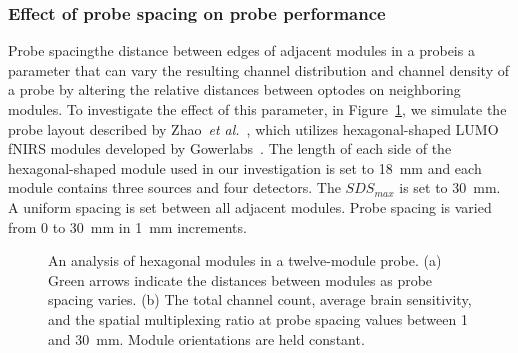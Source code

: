 \subsubsection{Effect of probe spacing on probe performance}
Probe spacing\textemdash the distance between edges of adjacent modules in a probe\textemdash is a parameter that can vary the resulting channel distribution and channel density of a probe by altering the relative distances between optodes on neighboring modules. To investigate the effect of this parameter, in Figure~\ref{fig:spacing}, we simulate the probe layout described by Zhao~\emph{et al.}~\cite{Zhao2019}, which utilizes hexagonal-shaped LUMO \ac{fNIRS} modules developed by Gowerlabs~\cite{Gowerlabs2019}. The length of each side of the hexagonal-shaped module used in our investigation is set to 18~mm and each module contains three sources and four detectors. The $SDS_{max}$ is set to 30~mm. A uniform spacing is set between all adjacent modules. Probe spacing is varied from 0 to 30~mm in 1~mm increments. 


\begin{figure}
\begin{center}
\end{center}
\caption {An analysis of hexagonal modules in a twelve-module probe. (a) Green arrows indicate the distances between modules as probe spacing varies. (b) The total channel count, average brain sensitivity, and the spatial multiplexing ratio at probe spacing values between 1 and 30~mm. Module orientations are held constant.} \label{fig:spacing}
\end{figure} 

